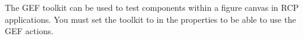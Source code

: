 
The GEF toolkit can be used to test components within a figure canvas in RCP applications. You must set the toolkit to  in the \gdproject{} properties to be able to use the GEF actions. 
